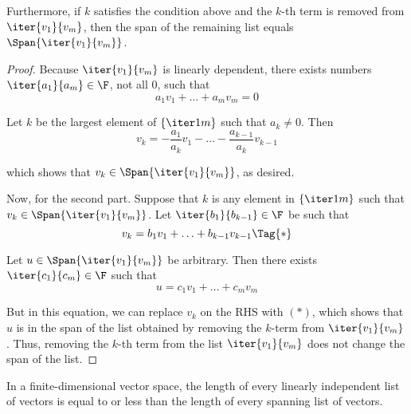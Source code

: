 Furthermore, if $k$ satisfies the condition above and the $k$-th term is
removed from $\iter{v_1}{v_m}$, then the span of the remaining list equals
$\Span\{\iter{v_1}{v_m}\}$.

\begin{proof}
  Because $\iter{v_1}{v_m}$ is linearly dependent, there exists numbers
  $\iter{a_1}{a_m}\in\F$, not all $0$, such that
  $$
    a_1v_1+\ldots+a_mv_m=0
  $$

  Let $k$ be the largest element of $\{\iter1m\}$ such that $a_k\neq0$. Then
  $$
    v_k=-\frac{a_1}{a_k}v_1-\ldots-\frac{a_{k-1}}{a_k}v_{k-1}
  $$

  which shows that $v_k\in\Span\{\iter{v_1}{v_m}\}$, as desired.

  Now, for the second part. Suppose that $k$ is any element in $\{\iter1m\}$
  such that $v_k\in\Span\{\iter{v_1}{v_m}\}$. Let $\iter{b_1}{b_{k-1}}\in\F$ be
  such that
  \begin{equation*}
    v_k=b_1v_1+\ldots+b_{k-1}v_{k-1}\Tag{*}
  \end{equation*}

  Let $u\in\Span\{\iter{v_1}{v_m}\}$ be arbitrary. Then there exists
  $\iter{c_1}{c_m}\in\F$ such that
  $$
    u=c_1v_1+\ldots+c_mv_m
  $$

  But in this equation, we can replace $v_k$ on the RHS with $(*)$, which shows
  that $u$ is in the span of the list obtained by removing the $k$-term from
  $\iter{v_1}{v_m}$. Thus, removing the $k$-th term from the list
  $\iter{v_1}{v_m}$ does not change the span of the list.
\end{proof}

\label{d8487b6}

In a finite-dimensional vector space, the length of every linearly independent
list of vectors is equal to or less than the length of every spanning list of
vectors.

